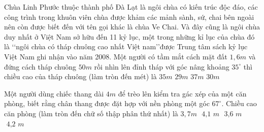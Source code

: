 \begin{ex}%
	Chùa Linh Phước thuộc thành phố Đà Lạt là ngôi chùa có kiến trúc độc đáo, các công trình trong khuôn viên chùa được khảm các mảnh sành, sứ, chai bên ngoài nên còn được biết đến với tên gọi khác là chùa Ve Chai. Và đây cũng là ngôi chùa duy nhất ở Việt Nam sở hữu đến 11 kỷ lục, một trong những kỉ lục của chùa đó là \lq\lq ngôi chùa có tháp chuông cao nhất Việt nam\rq\rq được Trung tâm sách kỷ lục Việt Nam ghi nhận vào năm 2008. Một người có tầm mắt cách mặt đất $1,6m$ và đứng cách tháp chuông $50m$ rồi nhìn lên đỉnh tháp với góc nâng khoảng $35^\circ$ thì chiều cao của tháp chuông (làm tròn đến mét) là
	\choice
	{$35m$}
	{$29m$}
	{\True $37m$}
	{$30m$}
\end{ex}
\begin{ex}%
%
Một người dùng chiếc thang dài $4m$ để trèo lên kiểm tra gác xép của một căn phòng, biết rằng chân thang được đặt hợp với nền phòng một góc $67^\circ$. Chiều cao căn phòng (làm tròn đến chữ số thập phân thứ nhất) là
\choice
{\True $3,7m$}
{$\text{ 4,1 }m$}
{$\text{ 3,6 }m$}
{$\text{ 4,2 }m$}
\end{ex}
